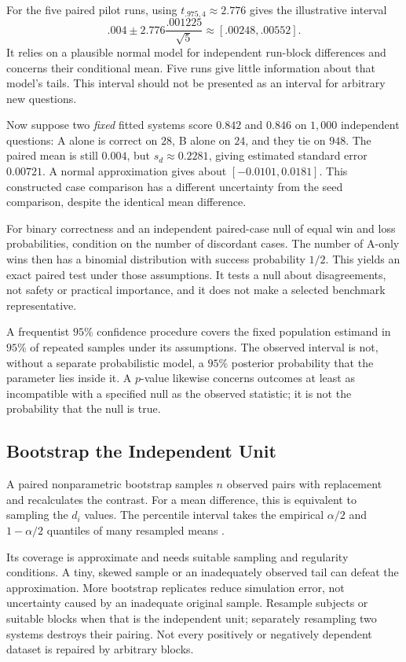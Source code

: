 For the five paired pilot runs, using $t_{.975,4}\approx2.776$ gives the illustrative interval
\[
.004\pm2.776\frac{.001225}{\sqrt5}
\approx[.00248,.00552].
\]
It relies on a plausible normal model for independent run-block differences and concerns their conditional mean. Five runs give little information about that model's tails. This interval should not be presented as an interval for arbitrary new questions.

Now suppose two \emph{fixed} fitted systems score $0.842$ and $0.846$ on $1{,}000$ independent questions: A alone is correct on $28$, B alone on $24$, and they tie on $948$. The paired mean is still $0.004$, but $s_d\approx0.2281$, giving estimated standard error $0.00721$. A normal approximation gives about $[-0.0101,0.0181]$. This constructed case comparison has a different uncertainty from the seed comparison, despite the identical mean difference.

For binary correctness and an independent paired-case null of equal win and loss probabilities, condition on the number of discordant cases. The number of A-only wins then has a binomial distribution with success probability $1/2$. This yields an exact paired test under those assumptions. It tests a null about disagreements, not safety or practical importance, and it does not make a selected benchmark representative.

A frequentist $95\%$ confidence procedure covers the fixed population estimand in $95\%$ of repeated samples under its assumptions. The observed interval is not, without a separate probabilistic model, a $95\%$ posterior probability that the parameter lies inside it. A $p$-value likewise concerns outcomes at least as incompatible with a specified null as the observed statistic; it is not the probability that the null is true.

\subsection{Bootstrap the Independent Unit}

A paired nonparametric bootstrap samples $n$ observed pairs with replacement and recalculates the contrast. For a mean difference, this is equivalent to sampling the $d_i$ values. The percentile interval takes the empirical $\alpha/2$ and $1-\alpha/2$ quantiles of many resampled means \citep{efron1993bootstrap}.

Its coverage is approximate and needs suitable sampling and regularity conditions. A tiny, skewed sample or an inadequately observed tail can defeat the approximation. More bootstrap replicates reduce simulation error, not uncertainty caused by an inadequate original sample. Resample subjects or suitable blocks when that is the independent unit; separately resampling two systems destroys their pairing. Not every positively or negatively dependent dataset is repaired by arbitrary blocks.

